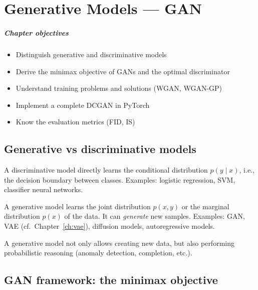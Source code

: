 \chapter{Generative Models --- GAN}
\label{ch:gan}

\paragraph{Chapter objectives}
\begin{itemize}
\item Distinguish generative and discriminative models
\item Derive the minimax objective of GANs and the optimal discriminator
\item Understand training problems and solutions (WGAN, WGAN-GP)
\item Implement a complete DCGAN in PyTorch
\item Know the evaluation metrics (FID, IS)
\end{itemize}

\section{Generative vs discriminative models}
\label{sec:gen-vs-disc}

\begin{definition}
A discriminative model directly learns the conditional distribution $p(y \mid x)$, i.e., the decision boundary between classes. Examples: logistic regression, SVM, classifier neural networks.
\end{definition}

\begin{definition}
A generative model learns the joint distribution $p(x, y)$ or the marginal distribution $p(x)$ of the data. It can \emph{generate} new samples. Examples: GAN, VAE (cf.\ Chapter~\ref{ch:vae}), diffusion models, autoregressive models.
\end{definition}

\begin{remark}
A generative model not only allows creating new data, but also performing probabilistic reasoning (anomaly detection, completion, etc.).
\end{remark}

\section{GAN framework: the minimax objective}
\label{sec:gan-framework}

